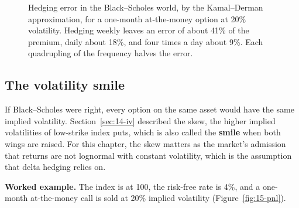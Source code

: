 \begin{figure}[htbp]
\centering
{}
\caption{Hedging error in the Black--Scholes world, by the Kamal--Derman approximation, for a one-month at-the-money option at 20\% volatility. Hedging weekly leaves an error of about 41\% of the premium, daily about 18\%, and four times a day about 9\%. Each quadrupling of the frequency halves the error.}
\label{fig:15-freq}
\end{figure}

\subsection{The volatility smile}

If Black--Scholes were right, every option on the same asset would have the same implied volatility. Section~\ref{sec:14-iv} described the skew, the higher implied volatilities of low-strike index puts, which is also called the \textbf{smile} when both wings are raised. For this chapter, the skew matters as the market's admission that returns are not lognormal with constant volatility, which is the assumption that delta hedging relies on.

\textbf{Worked example.} The index is at 100, the risk-free rate is 4\%, and a one-month at-the-money call is sold at 20\% implied volatility (Figure~\ref{fig:15-pnl}).

